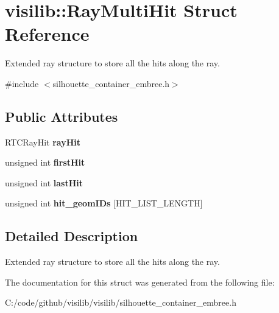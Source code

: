 \hypertarget{structvisilib_1_1_ray_multi_hit}{}\section{visilib\+::Ray\+Multi\+Hit Struct Reference}
\label{structvisilib_1_1_ray_multi_hit}


Extended ray structure to store all the hits along the ray.  




{\ttfamily \#include $<$silhouette\+\_\+container\+\_\+embree.\+h$>$}

\subsection*{Public Attributes}
\begin{DoxyCompactItemize}
\item 
\mbox{\label{structvisilib_1_1_ray_multi_hit_a3f8a378c9a5b213d64f0616262322dad}} 
R\+T\+C\+Ray\+Hit {\bfseries ray\+Hit}
\item 
\mbox{\label{structvisilib_1_1_ray_multi_hit_a6a0dcd46cec9bc639a43b2151b05105a}} 
unsigned int {\bfseries first\+Hit}
\item 
\mbox{\label{structvisilib_1_1_ray_multi_hit_a03e1f83d769c1405441cc31afc7d67fc}} 
unsigned int {\bfseries last\+Hit}
\item 
\mbox{\label{structvisilib_1_1_ray_multi_hit_abd9e86ea3f60605b165a9ff24ceb2e35}} 
unsigned int {\bfseries hit\+\_\+geom\+I\+Ds} \mbox{[}H\+I\+T\+\_\+\+L\+I\+S\+T\+\_\+\+L\+E\+N\+G\+TH\mbox{]}
\end{DoxyCompactItemize}


\subsection{Detailed Description}
Extended ray structure to store all the hits along the ray. 

The documentation for this struct was generated from the following file\+:\begin{DoxyCompactItemize}
\item 
C\+:/code/github/visilib/visilib/silhouette\+\_\+container\+\_\+embree.\+h\end{DoxyCompactItemize}

